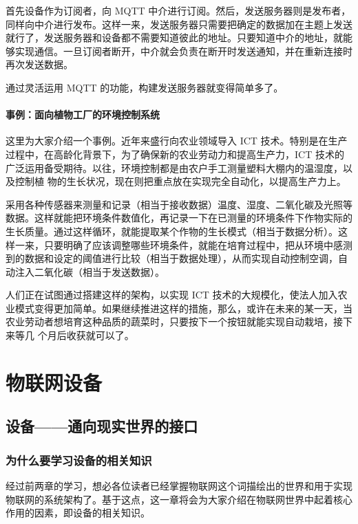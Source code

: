 \documentclass[12pt,UTF8]{ctexbook}
\begin{document}
首先设备作为订阅者，向 MQTT 中介进行订阅。然后，发送服务器则是发布者，同样向中介进行发布。这样一来，发送服务器只需要把确定的数据加在主题上发送就行了，发送服务器和设备都不需要知道彼此的地址。只要知道中介的地址，就能够实现通信。一旦订阅者断开，中介就会负责在断开时发送通知，并在重新连接时再次发送数据。

通过灵活运用 MQTT 的功能，构建发送服务器就变得简单多了。

\subsubsection{事例：面向植物工厂的环境控制系统}

这里为大家介绍一个事例。近年来盛行向农业领域导入 ICT 技术。特别是在生产过程中，在高龄化背景下，为了确保新的农业劳动力和提高生产力，ICT 技术的广泛运用备受期待。以往，环境控制都是由农户手工测量塑料大棚内的温湿度，以及控制植
物的生长状况，现在则把重点放在实现完全自动化，以提高生产力上。

采用各种传感器来测量和记录（相当于接收数据）温度、湿度、二氧化碳及光照等数据。这样就能把环境条件数值化，再记录一下在已测量的环境条件下作物实际的生长质量。通过这样循环，就能提取某个作物的生长模式（相当于数据分析）。这样一来，只要明确了应该调整哪些环境条件，就能在培育过程中，把从环境中感测到的数据和设定的阈值进行比较（相当于数据处理），从而实现自动控制空调，自动注入二氧化碳（相当于发送数据）。

人们正在试图通过搭建这样的架构，以实现 ICT 技术的大规模化，使法人加入农业模式变得更加简单。如果继续推进这样的措施，那么，或许在未来的某一天，当农业劳动者想培育这种品质的蔬菜时，只要按下一个按钮就能实现自动栽培，接下来等几
个月后收获就可以了。

\chapter{物联网设备}

\section{设备——通向现实世界的接口}

\subsection{为什么要学习设备的相关知识}

经过前两章的学习，想必各位读者已经掌握物联网这个词描绘出的世界和用于实现物联网的系统架构了。基于这点，这一章将会为大家介绍在物联网世界中起着核心作用的因素，即设备的相关知识。
\end{document}
